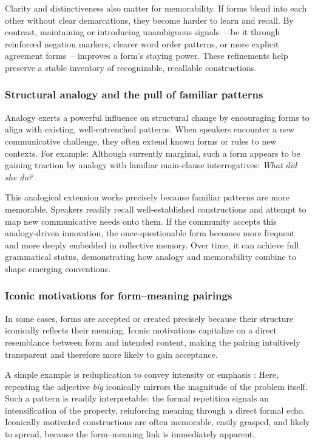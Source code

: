 \documentclass[12pt,letterpaper]{article}
\begin{document}
Clarity and distinctiveness also matter for memorability. If forms blend into each other without clear demarcations, they become harder to learn and recall. By contrast, maintaining or introducing unambiguous signals~-- be it through reinforced negation markers, clearer word order patterns, or more explicit agreement forms~-- improves a form’s staying power. These refinements help preserve a stable inventory of recognizable, recallable constructions.

\subsubsection{Structural analogy and the pull of familiar patterns}

Analogy exerts a powerful influence on structural change by encouraging forms to align with existing, well-entrenched patterns. When speakers encounter a new communicative challenge, they often extend known forms or rules to new contexts. For example:
\z
Although currently marginal, such a form appears to be gaining traction by analogy with familiar main-clause interrogatives:
\ea
\textit{What did she do?}
\z

This analogical extension works precisely because familiar patterns are more memorable. Speakers readily recall well-established constructions and attempt to map new communicative needs onto them. If the community accepts this analogy-driven innovation, the once-questionable form becomes more frequent and more deeply embedded in collective memory. Over time, it can achieve full grammatical status, demonstrating how analogy and memorability combine to shape emerging conventions.

\subsubsection{Iconic motivations for form--meaning pairings}\label{subsec:iconic-motivations}

In some cases, forms are accepted or created precisely because their structure iconically reflects their meaning. Iconic motivations capitalize on a direct resemblance between form and intended content, making the pairing intuitively transparent and therefore more likely to gain acceptance.

A simple example is reduplication to convey intensity or emphasis \autocite{Moravcsik1978}:
\label{ex:big-big}
\z
Here, repeating the adjective \textit{big} iconically mirrors the magnitude of the problem itself. Such a pattern is readily interpretable: the formal repetition signals an intensification of the property, reinforcing meaning through a direct formal echo. Iconically motivated constructions are often memorable, easily grasped, and likely to spread, because the form--meaning link is immediately apparent.
\end{document}
